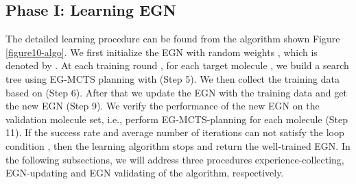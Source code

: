 \documentclass[sn-mathphys,Numbered]{sn-jnl}
\begin{document}
    













\subsection{Phase I: Learning EGN}
The detailed learning procedure can be found from the algorithm shown Figure \ref{figure10-algo}. We first initialize the EGN with random weights , which is denoted by . At each training round , for each target molecule , we build a search tree  using EG-MCTS planning with  (Step 5). We then collect the training data based on  (Step 6). After that we update the EGN with the training data and get the new EGN (Step 9). We verify the performance of the new EGN on the validation molecule set, i.e., perform EG-MCTS-planning for each molecule (Step 11). If the success rate and average number of iterations can not satisfy the loop condition , then the learning algorithm stops and return the well-trained EGN.
In the following subsections, we will address three procedures experience-collecting, EGN-updating and EGN validating of the algorithm, respectively.
\end{document}

